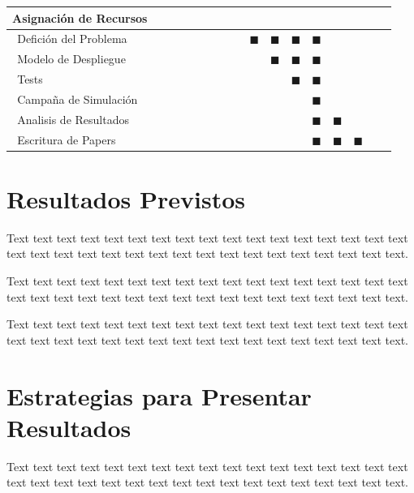 \documentclass[12pt,a4paper]{article}
\begin{document}
\begin{table}[H]
\begin{center}
\begin{tabular}{|p{4.0cm}|c|c|c|c|c|c|c|c|c|c|c|c|c|c|c|c|}
\textbf{Asignación de Recursos} &  &  &  &  &      &  &  &  &      &  &  &  &      &  &  &  \\ \hline
$~~$Defición del Problema       &  &  &  &  &      &  &  &  &     $\blacksquare$ & $\blacksquare$ & $\blacksquare$ & $\blacksquare$ &      &  &  &  \\ \hline
$~~$Modelo de Despliegue        &  &  &  &  &      &  &  &  &      & $\blacksquare$ & $\blacksquare$ & $\blacksquare$ &      &  &  &  \\ \hline
$~~$Tests                    &  &  &  &  &      &  &  &  &      &  & $\blacksquare$ & $\blacksquare$ &      &  &  &  \\ \hline
$~~$Campaña de Simulación     &  &  &  &  &      &  &  &  &      &  &  & $\blacksquare$ &      &  &  &  \\ \hline
$~~$Analisis de Resultados      &  &  &  &  &      &  &  &  &      &  &  & $\blacksquare$ &     $\blacksquare$ &  &  &  \\ \hline
$~~$Escritura de Papers        &  &  &  &  &      &  &  &  &      &  &  & $\blacksquare$ &     $\blacksquare$ & $\blacksquare$ &  &  \\ \hline 
\end{tabular}
\end{center}
\end{table}
\section{Resultados Previstos}
Text text text text text text text text text text text  text text text text text text text text text text text text text text text text text text text text text text text.

Text text text text text text text text text text text  text text text text text text text text text text text text text text text text text text text text text text text.

Text text text text text text text text text text text  text text text text text text text text text text text text text text text text text text text text text text text.
\section{Estrategias para Presentar Resultados}
Text text text text text text text text text text text  text text text text text text text text text text text text text text text text text text text text text text text.
\end{document}
